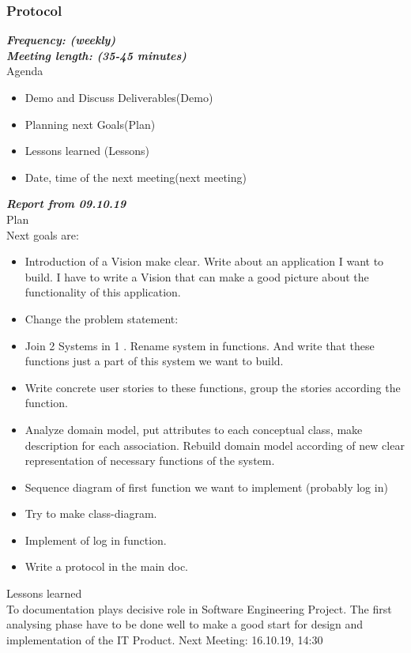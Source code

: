 \documentclass{scrartcl}
\begin{document}
   
   
   
    
   
  

\subsubsection{Protocol}
\textbf{\textit{Frequency: (weekly) \\
Meeting length: (35-45 minutes)}}\\

Agenda

\begin{itemize}
  	\item Demo and Discuss Deliverables(Demo)
  	\item Planning next Goals(Plan)
  	\item Lessons learned (Lessons)
  	\item Date, time of the next meeting(next meeting)
 \end{itemize} 	


\textbf{\textit{Report from 09.10.19}}\\
Plan\\
Next goals are: 
\begin{itemize}


	\item Introduction of a Vision make clear. Write about an application I want to build. I have to write a Vision that can make a good picture about the functionality of this application.
	\item	Change the problem statement: 
	\item	Join 2 Systems in 1 . Rename system in functions. And write that these functions just a part of this system we want to build. 
	\item	Write concrete user stories to these functions, group the stories according the function.
	\item	Analyze domain model, put attributes to each conceptual class, make description for each association. Rebuild domain model according of new clear representation of necessary functions of the system.
	\item	Sequence diagram of first function we want to implement (probably log in)
	\item	Try to make class-diagram.
	\item	Implement of log in function.
	\item	Write a protocol in the main doc.
\end{itemize}	
Lessons learned\\
To documentation plays decisive role in Software Engineering Project. The first analysing phase have to be done well to make a good start for design and implementation of the IT Product.
Next Meeting: 16.10.19, 14:30\\
\end{document}

